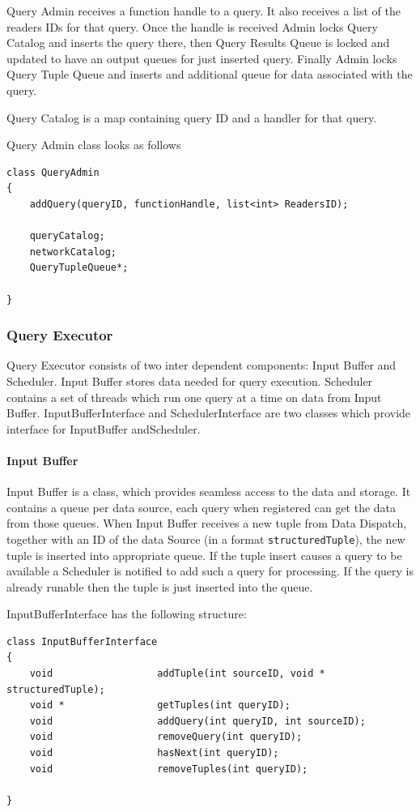 \documentclass[14pt]{article}
\begin{document}
Query Admin receives a function handle to a query. It also receives a list of the readers IDs for that query. Once the handle is received Admin locks Query Catalog and inserts the query there, then Query Results Queue is locked and updated to have an output queues for just inserted query. Finally Admin locks Query Tuple Queue and inserts and additional queue for data associated with the query. 

Query Catalog is a map containing query ID and a handler for that query. 

Query Admin class looks as follows
\begin{verbatim}
class QueryAdmin
{
    addQuery(queryID, functionHandle, list<int> ReadersID);

	queryCatalog;
	networkCatalog;
	QueryTupleQueue*;
	
}
\end{verbatim}

\subsubsection{Query Executor}

Query Executor consists of two inter dependent components: Input Buffer and Scheduler. Input Buffer stores data needed for query execution. Scheduler contains a set of threads which run one query at a time on data from Input Buffer. InputBufferInterface and SchedulerInterface are two classes which provide interface for InputBuffer andScheduler. 

\paragraph{Input Buffer}

Input Buffer is a class, which provides seamless access to the data and storage. It contains a queue per data source, each query when registered can get the data from those queues. When Input Buffer receives a new tuple from Data Dispatch, together with an ID of the data Source (in a format {\tt structuredTuple}), the new tuple is inserted into appropriate queue. If the tuple insert causes a query to be available a Scheduler is notified to add such a query for processing. If the query is already runable then the tuple is just inserted into the queue.

\noindent InputBufferInterface has the following structure:

\begin{verbatim}
class InputBufferInterface
{
    void                  addTuple(int sourceID, void * structuredTuple);
    void *                getTuples(int queryID);
    void                  addQuery(int queryID, int sourceID);
    void                  removeQuery(int queryID);
    void                  hasNext(int queryID);
    void                  removeTuples(int queryID);
	
}
\end{verbatim}
\end{document}
